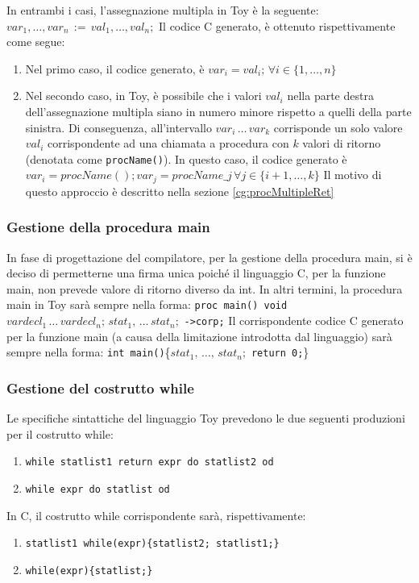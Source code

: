 \documentclass[a4paper,12pt]{article}
\begin{document}
		In entrambi i casi, l'assegnazione multipla in Toy è la seguente: $var_1, \dots, var_n\, := \, val_1, \dots, val_n;$ 			
		Il codice C generato, è ottenuto rispettivamente come segue:
		\begin{enumerate}
			\item Nel primo caso, il codice generato, è $var_i = val_i; \, \forall i \in \{1, \dots, n\}$
					
			\item	Nel secondo caso, in Toy, è possibile che i valori $val_i$ nella parte destra dell'assegnazione multipla siano in numero
					minore rispetto a quelli della parte sinistra. Di conseguenza, all'intervallo $var_i \, \dots \, var_k$ corrisponde un solo valore $val_i$ corrispondente
					ad una chiamata a procedura con $k$ valori di ritorno (denotata come \texttt{procName()}).
					In questo caso, il codice generato è $var_i = procName(); var_j = procName\_j \, \forall j \in \{i+1, \dots, k\}$\newline
					Il motivo di questo approccio è descritto nella sezione \ref{cg:procMultipleRet}
		\end{enumerate}
	
	\subsubsection{Gestione della procedura main}
	In fase di progettazione del compilatore, per la gestione della procedura main, si è deciso di permetterne una firma unica
	poiché il linguaggio C, per la funzione main, non prevede valore di ritorno diverso da int.
	In altri termini, la procedura main in Toy sarà sempre nella forma:\newline
	\texttt{proc main() void} \, $vardecl_1 \, \dots \, vardecl_n; \, stat_1, \, \dots \, stat_n;$ \texttt{->corp;} \newline
	Il corrispondente codice C generato per la funzione main (a causa della limitazione introdotta dal linguaggio) sarà sempre nella forma:\newline
	\texttt{int main()}\{$stat_1, \, \dots, \, stat_n;$ \texttt{return 0;}\}
	

	\subsubsection{Gestione del costrutto while}
	Le specifiche sintattiche del linguaggio Toy prevedono le due seguenti produzioni per il costrutto while:
	\begin{enumerate}
		\item 	\texttt{while statlist1 return expr do statlist2 od} 
		\item 	\texttt{while expr do statlist od}
	\end{enumerate}
	In C, il costrutto while corrispondente sarà, rispettivamente:
	\begin{enumerate}
		\item 	\texttt{statlist1 while(expr)\{statlist2; statlist1;\}} 
		\item 	\texttt{while(expr)\{statlist;\}}
	\end{enumerate}
	
\end{document}
